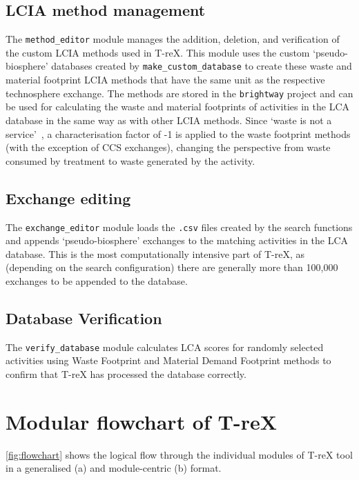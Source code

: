 \documentclass{article}
\renewcommand{\texttt}[1]{{\ttfamily\small\nolinkurl{#1}}}
\begin{document}
\subsection{LCIA method management}
The \texttt{method\_editor} module manages the addition, deletion, and verification of the custom LCIA methods used in T-reX. This module uses the custom `pseudo-biosphere' databases created by \texttt{make\_custom\_database} to create these waste and material footprint LCIA methods that have the same unit as the respective technosphere exchange. The methods are stored in the \texttt{brightway} project and can be used for calculating the waste and material footprints of activities in the LCA database in the same way as with other LCIA methods. Since `waste is not a service'~\citep{guinee2021wasteisnotaservice}, a characterisation factor of -1 is applied to the waste footprint methods (with the exception of CCS exchanges), changing the perspective from waste consumed by treatment to waste generated by the activity.

\subsection{Exchange editing}
The \texttt{exchange\_editor} module loads the \texttt{.csv} files created by the search functions and appends `pseudo-biosphere' exchanges to the matching activities in the LCA database. This is the most computationally intensive part of T-reX, as (depending on the search configuration) there are generally more than 100,000 exchanges to be appended to the database.

\subsection{Database Verification}
The \texttt{verify\_database} module calculates LCA scores for randomly selected activities using Waste Footprint and Material Demand Footprint methods to confirm that T-reX has processed the database correctly.

\section{Modular flowchart of T-reX}

\autoref{fig:flowchart} shows the logical flow through the individual modules of T-reX tool in a generalised (a) and module-centric (b) format.
\end{document}
